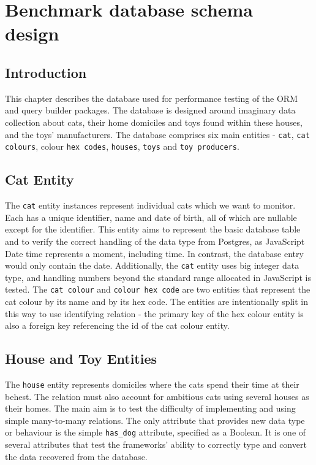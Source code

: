 \chapter{Benchmark database schema design}

\section{Introduction}
This chapter describes the database used for performance testing of the ORM and
query builder packages. The database is designed around imaginary data
collection about cats, their home domiciles and toys found within these houses,
and the toys' manufacturers. The database comprises six main entities -
\texttt{cat}, \texttt{cat colours}, colour \texttt{hex codes}, \texttt{houses},
\texttt{toys} and \texttt{toy producers}.

\section{Cat Entity}
The \texttt{cat} entity instances represent individual cats which we want to
monitor. Each has a unique identifier, name and date of birth, all of which are
nullable except for the identifier. This entity aims to represent the basic
database table and to verify the correct handling of the data type from
Postgres, as JavaScript Date time represents a moment, including time. In
contrast, the database entry would only contain the date. Additionally, the
\texttt{cat} entity uses big integer data type, and handling numbers beyond the
standard range allocated in JavaScript is tested. The \texttt{cat colour} and
\texttt{colour hex code} are two entities that represent the cat colour by its
name and by its hex code. The entities are intentionally split in this way to
use identifying relation - the primary key of the hex colour entity is also a
foreign key referencing the id of the cat colour entity.

\section{House and Toy Entities}
The \texttt{house} entity represents domiciles where the cats spend their time
at their behest. The relation must also account for ambitious cats using several
houses as their homes. The main aim is to test the difficulty of implementing
and using simple many-to-many relations. The only attribute that provides new
data type or behaviour is the simple \verb|has_dog| attribute, specified as a
Boolean. It is one of several attributes that test the frameworks' ability to
correctly type and convert the data recovered from the database.

